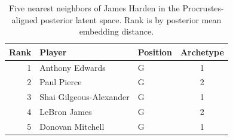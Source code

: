 \begin{table}[htbp]
  \centering\small
  \begin{tabular}{rllc}
    \toprule
    Rank & Player & Position & Archetype \\
    \midrule
    1 & Anthony Edwards & G & 1 \\
    2 & Paul Pierce & G & 2 \\
    3 & Shai Gilgeous-Alexander & G & 1 \\
    4 & LeBron James & G & 2 \\
    5 & Donovan Mitchell & G & 1 \\
    \bottomrule
  \end{tabular}
  \caption{Five nearest neighbors of James Harden in the Procrustes-aligned posterior latent space. Rank is by posterior mean embedding distance.}
  \label{tab:James_Harden_neighbors}
\end{table}


